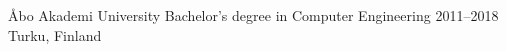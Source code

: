 \cventry
    {Åbo Akademi University}
    {Bachelor's degree in Computer Engineering}
    {2011--2018}
    {Turku, Finland}
